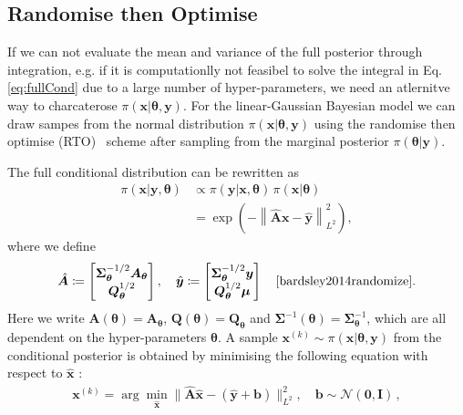 \subsection{Randomise then Optimise}
\label{subsec:RTO}
If we can not evaluate the mean and variance of the full posterior through integration, e.g. if it is computationlly not feasibel to solve the integral in Eq. \ref{eq:fullCond} due to a large number of hyper-parameters, we need an atlernitve way to charcaterose $\pi(\bm{x} |  \bm{\theta}, \bm{y})$.
For the linear-Gaussian Bayesian model we can draw sampes from the normal distribution $\pi(\bm{x} |  \bm{\theta}, \bm{y})$ using the randomise then optimise (RTO)~\cite{bardsley2012mcmc} scheme after sampling from the marginal posterior $\pi(\bm{\theta} |  \bm{y})$.

The full conditional distribution can be rewritten as
\begin{align}
	\pi(\bm{x} |  \bm{y}, \bm{\theta}) &\propto \pi(\bm{y} |  \bm{x}, \bm{\theta}) \, \pi(\bm{x} |  \bm{\theta}) \\
	&= \exp \left( -\left\lVert \hat{\bm{A}} \bm{x} - \hat{\bm{y}} \right\rVert_{L^2}^2 \right),
\end{align}
where we define
\begin{align}
	\label{eq:minimizer}
	\hat{\bm{A}} \coloneqq 
	\begin{bmatrix}
		\bm{\Sigma}_{\bm{\theta}}^{-1/2} \bm{A}_{\bm{\theta}} \\
		\bm{Q}_{\bm{\theta}}^{1/2}
	\end{bmatrix}, \quad 
	\hat{\bm{y}} \coloneqq 
	\begin{bmatrix}
		\bm{\Sigma}_{\bm{\theta}}^{-1/2} \bm{y} \\
		\bm{Q}_{\bm{\theta}}^{1/2} \bm{\mu}
	\end{bmatrix} \quad \text{\cite{bardsley2014randomize}}.
\end{align}
Here we write $\bm{A}(\bm{\theta}) = \bm{A}_{\bm{\theta}}$, $\bm{Q}(\bm{\theta}) = \bm{Q}_{\bm{\theta}} $ and $\bm{\Sigma}^{-1}(\bm{\theta}) = \bm{\Sigma}^{-1}_{\bm{\theta}}$, which are all dependent on the hyper-parameters $\bm{\theta}$.
A sample $\bm{x}^{(k)} \sim \pi(\bm{x}|   \bm{\theta}, \bm{y}) $ from the conditional posterior is obtained by minimising the following equation with respect to $\hat{\bm{x}}$ :
\begin{align}
	\bm{x}^{(k)} = \arg \min_{\hat{\bm{x}}} \lVert \hat{\bm{A}} \hat{\bm{x}} - ( \hat{\bm{y}} + \bm{b} ) \rVert_{L^2}^2 , \quad \bm{b} \sim \mathcal{N}(\bm{0}, \mathbf{I}) \, ,
\end{align}
